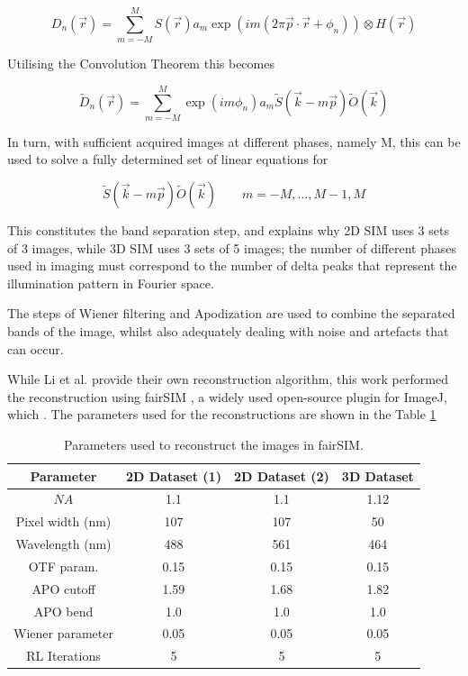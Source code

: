 \documentclass[12pt]{article}
\newcommand\NA{\mathit{NA}}
\begin{document}
\[D_n(\vec{r}) = \sum_{m=-M}^{M}{S(\vec{r})a_m\exp(im(2\pi\vec{p}\cdot\vec{r}+\phi_n))\otimes H(\vec{r})}\]

Utilising the Convolution Theorem this becomes

\[\tilde{D}_n(\vec{r}) = \sum_{m=-M}^{M}{\exp(im\phi_n)a_m\tilde{S}(\vec{k}-m\vec{p})\tilde{O}(\vec{k})}\]

In turn, with sufficient acquired images at different phases, namely M, this can be used to solve a fully determined set of linear equations for

\[\tilde{S}(\vec{k}-m\vec{p})\tilde{O}(\vec{k})\qquad m=-M,\dots,M-1,M\]

This constitutes the band separation step, and explains why 2D SIM uses 3 sets of 3 images, while 3D SIM uses 3 sets of 5 images;
the number of different phases used in imaging must correspond to the number of delta peaks that represent the illumination pattern in Fourier space.

The steps of Wiener filtering and Apodization are used to combine the separated bands of the image,
whilst also adequately dealing with noise and artefacts that can occur.

While Li et al. provide their own reconstruction algorithm, this work performed the reconstruction using fairSIM \cite{fairSIM},
a widely used open-source plugin for ImageJ, which .
The parameters used for the reconstructions are shown in the Table \ref{tab:reconparams}

\begin{table}[htp]
    \centering
    \begin{tabular}{| c | c | c | c |}
        \hline
        Parameter & 2D Dataset (1) & 2D Dataset (2) & 3D Dataset \\
        \hline
        $\NA$  & 1.1 & 1.1 & 1.12 \\
        \hline
        Pixel width (nm) & 107 & 107 & 50 \\
        \hline
        Wavelength (nm) & 488 & 561 & 464 \\
        \hline
        OTF param.  & 0.15 & 0.15 & 0.15 \\
        \hline
        APO cutoff & 1.59 & 1.68 & 1.82 \\
        \hline
        APO bend  & 1.0 & 1.0 & 1.0 \\
        \hline
        Wiener parameter & 0.05 & 0.05 & 0.05 \\
        \hline
        RL Iterations & 5 & 5 & 5\\
        \hline

    \end{tabular}
    \caption{Parameters used to reconstruct the images in fairSIM.}
    \label{tab:reconparams}
\end{table}
\end{document}
